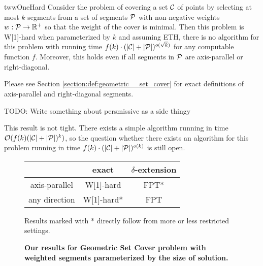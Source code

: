 \begin{restatable}{tw}{wOneHard}
\label{w1_hard}
	Consider the problem of covering a set $\mathcal{C}$ of points
	by selecting at most $k$ segments
	from a set of segments $\mathcal{P}$ 
	with non-negative weights $w : \mathcal{P} \rightarrow \mathbb{R^+}$
	so that the weight of the cover is minimal.
	Then this problem is W[1]-hard when parameterized by $k$ and
	assuming ETH, there is no algorithm for this
	problem with running time
	$f(k)\cdot(|\mathcal{C}| + |\mathcal{P}|)^{o(\sqrt{k})}$
	for any computable function $f$.
	Moreover, this holds even if all segments in $\mathcal{P}$
	are axis-parallel or right-diagonal.
\end{restatable}

Please see Section \ref{section:def:geometric__set_cover}
for exact definitions of axis-parallel and right-diagonal segments.

TODO: Write something about persmissive as a side thingy

This result is not tight. There exists a simple algorithm 
running in time ${\mathcal{O}(f(k)(|\mathcal{C}| + |\mathcal{P}|)^k)}$,
so the question whether there exists an algorithm
for this problem running in time ${f(k)\cdot(|\mathcal{C}| + |\mathcal{P}|)^{o(k)}}$
is still open.

\begin{figure}[h]
\begin{center}
\begin{tabular}{ | c | c | c | }
\hline
                & exact     & $\delta$-extension \\ 
\hline                
 axis-parallel   & W[1]-hard & FPT* \\  
\hline                
 any direction   & W[1]-hard* & FPT \\
\hline                
\end{tabular}
\caption{\textbf{Our results for Geometric Set Cover problem with weighted segments 
parameterized by the size of solution.}}

Results marked with * directly follow from more or less restricted settings.
\label{tab:weighted_fpt}
\end{center}
\end{figure}
